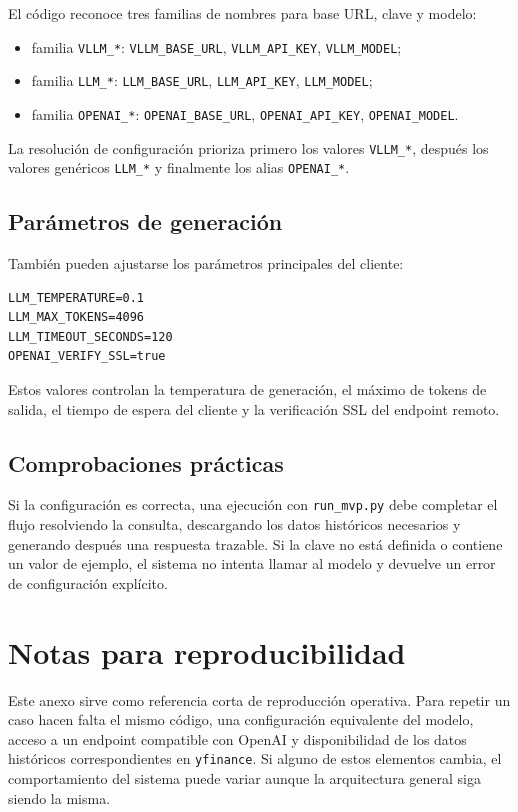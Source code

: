 El c\'odigo reconoce tres familias de nombres para base URL, clave y modelo:

\begin{itemize}
    \item familia \texttt{VLLM\_*}: \texttt{VLLM\_BASE\_URL}, \texttt{VLLM\_API\_KEY}, \texttt{VLLM\_MODEL};
    \item familia \texttt{LLM\_*}: \texttt{LLM\_BASE\_URL}, \texttt{LLM\_API\_KEY}, \texttt{LLM\_MODEL};
    \item familia \texttt{OPENAI\_*}: \texttt{OPENAI\_BASE\_URL}, \texttt{OPENAI\_API\_KEY}, \texttt{OPENAI\_MODEL}.
\end{itemize}

La resoluci\'on de configuraci\'on prioriza primero los valores \texttt{VLLM\_*}, despu\'es los valores gen\'ericos \texttt{LLM\_*} y finalmente los alias \texttt{OPENAI\_*}.

\subsection{Par\'ametros de generaci\'on}

Tambi\'en pueden ajustarse los par\'ametros principales del cliente:

\begin{verbatim}
LLM_TEMPERATURE=0.1
LLM_MAX_TOKENS=4096
LLM_TIMEOUT_SECONDS=120
OPENAI_VERIFY_SSL=true
\end{verbatim}

Estos valores controlan la temperatura de generaci\'on, el m\'aximo de tokens de salida, el tiempo de espera del cliente y la verificaci\'on SSL del endpoint remoto.

\subsection{Comprobaciones pr\'acticas}

Si la configuraci\'on es correcta, una ejecuci\'on con \texttt{run\_mvp.py} debe completar el flujo resolviendo la consulta, descargando los datos hist\'oricos necesarios y generando despu\'es una respuesta trazable. Si la clave no est\'a definida o contiene un valor de ejemplo, el sistema no intenta llamar al modelo y devuelve un error de configuraci\'on expl\'icito.

\section{Notas para reproducibilidad}

Este anexo sirve como referencia corta de reproducci\'on operativa. Para repetir un caso hacen falta el mismo c\'odigo, una configuraci\'on equivalente del modelo, acceso a un endpoint compatible con OpenAI y disponibilidad de los datos hist\'oricos correspondientes en \texttt{yfinance}. Si alguno de estos elementos cambia, el comportamiento del sistema puede variar aunque la arquitectura general siga siendo la misma.
